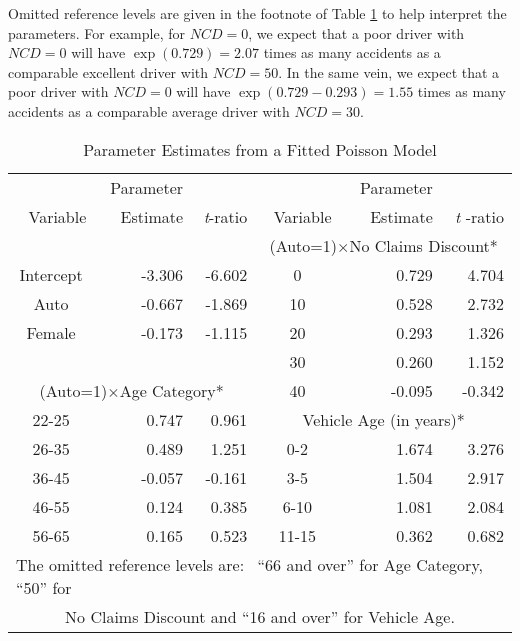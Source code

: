{Omitted reference levels are given in the footnote of Table
\ref{T12:SingPoissonEst} to help interpret the parameters. For
example, for $NCD=0$, we expect that a poor driver with $NCD=0$ will
have $\exp (0.729)=2.07$ times as many accidents as a comparable
excellent driver with $NCD=50$. In the same vein, we expect that a
poor driver with $NCD=0$ will have $\exp (0.729-0.293)=1.55$ times
as many accidents as a comparable average driver with $NCD=30$.

 \begin{table}[h]\begin{center}
\caption{\label{T12:SingPoissonEst} Parameter Estimates from a
Fitted Poisson Model} 
\begin{tabular}{rrr|rrr}
\hline
& Parameter &  &  & Parameter &  \\
Variable & Estimate & \textit{t}-ratio & Variable & Estimate & \textit{t}%
-ratio \\ \hline
\multicolumn{1}{c}{} &  &  & \multicolumn{3}{|c}{(Auto=1)$\times $No Claims
Discount*} \\
\multicolumn{1}{c}{Intercept} & -3.306 & -6.602 & \multicolumn{1}{|c}{0} &
0.729 & 4.704 \\
\multicolumn{1}{c}{Auto} & -0.667 & -1.869 & \multicolumn{1}{|c}{10} & 0.528
& 2.732 \\
\multicolumn{1}{c}{Female} & -0.173 & -1.115 & \multicolumn{1}{|c}{20} &
0.293 & 1.326 \\
\multicolumn{1}{c}{} &  &  & \multicolumn{1}{|c}{30} & 0.260 & 1.152 \\
\cline{1-3}
\multicolumn{3}{c|}{(Auto=1)$\times $Age Category*} & \multicolumn{1}{|c}{40}
& -0.095 & -0.342 \\ \cline{4-6}
\multicolumn{1}{c}{22-25} & 0.747 & 0.961 & \multicolumn{3}{|c}{Vehicle Age
(in years)*} \\
\multicolumn{1}{c}{26-35} & 0.489 & 1.251 & \multicolumn{1}{|c}{0-2} & 1.674
& 3.276 \\
\multicolumn{1}{c}{36-45} & -0.057 & -0.161 & \multicolumn{1}{|c}{3-5} &
1.504 & 2.917 \\
\multicolumn{1}{c}{46-55} & 0.124 & 0.385 & \multicolumn{1}{|c}{6-10} & 1.081
& 2.084 \\
\multicolumn{1}{c}{56-65} & 0.165 & 0.523 &
\multicolumn{1}{|c}{11-15} & 0.362 & 0.682 \\ \hline
\multicolumn{6}{l}{\small *The omitted reference levels are: \ ``66
and over'' for Age Category, ``50'' for} \\
\multicolumn{6}{c}{\small No Claims Discount and ``16 and over'' for
Vehicle Age.}
\end{tabular} \end{center} 
\end{table}

}
